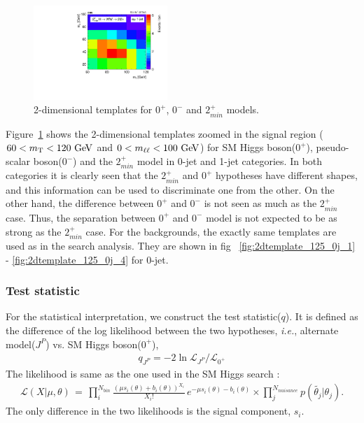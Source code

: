 \begin{figure}[ht!]
\includegraphics[width=0.45\textwidth]{figures/2d_prefit_1j_125_spin2_paper.pdf}
\caption{2-dimensional templates for $0^+$, $0^-$ and $2_{min}^+$ models.} 
\label{fig:2dtemplates_spin} 
\end{figure} 

Figure~\ref{fig:2dtemplates_spin} shows the 2-dimensional templates zoomed in the signal region
($60<m_{\mathrm{T}}<120~\mathrm{Ge\kern -0.1em V}$ and $0<m_{\ell\ell}<100~\mathrm{Ge\kern -0.1em V}$) for SM Higgs boson($0^+$), 
pseudo-scalar boson($0^-$) and the $2_{min}^+$ model in 0-jet and 1-jet categories. 
In both categories it is clearly seen that the $2_{min}^+$ and $0^+$ hypotheses have different shapes,
and this information can be used to discriminate one from the other.
On the other hand, the difference between $0^+$ and $0^-$ 
is not seen as much as the $2_{min}^+$ case. 
Thus, the separation between $0^+$ and $0^-$ model is not expected to be 
as strong as the $2_{min}^+$ case.  
For the backgrounds, the exactly same templates are used as in the 
search analysis. They are shown in fig ~\ref{fig:2dtemplate_125_0j_1}
- \ref{fig:2dtemplate_125_0j_4} for 0-jet. 

\subsubsection{Test statistic}

For the statistical interpretation, we construct the test statistic($q$). 
It is defined as the difference of the log likelihood between the two 
hypotheses, \textit{i.e.}, alternate model($J^P$) vs. SM Higgs boson($0^+$), 
\begin{eqnarray} 
q_{J^P} = -2 \ln \mathcal{L}_{J^P} / \mathcal{L}_{0^+}  
\end{eqnarray} 
The likelihood is same as the one used in the SM Higgs search :  
\begin{eqnarray} 
\mathcal{L} ( X | \mu, \theta) 
\, = \,
\prod_{i}^{N_{bin}} \frac{ \left( \mu s_i(\theta) + b_i(\theta) \right)^{X_i}}{X_i!} 
\, e^{ - \mu s_i(\theta) - b_i(\theta) }   \times
\prod_{j}^{N_{nuisance}} p\left( \tilde{\theta_j} | \theta_j \right).
\end{eqnarray}
The only difference in the two likelihoods is the signal component, $s_i$.

